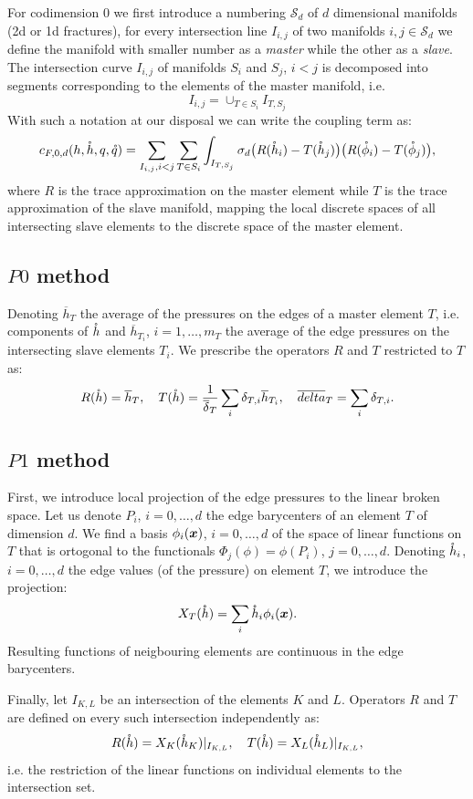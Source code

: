 For codimension 0 we first introduce a numbering $\mathcal{S}_d$ of $d$ dimensional manifolds (2d or 1d fractures), for every intersection line $I_{i,j}$ 
of two manifolds  $i,j \in \mathcal{S}_d$ we define the manifold with smaller number as a \emph{master} while the other as a \emph{slave}. 
The intersection curve $I_{i,j}$ of manifolds $S_i$ and $S_j$, $i<j$ is decomposed into segments corresponding to the elements of the master manifold, i.e.
\[
    I_{i,j} =\cup_{T\in S_i} I_{T, S_j}
\]    
With such a notation at our disposal we can write the coupling term as:
\begin{equation*}
  c_{F,0,d}(h, \mathring h, q, \mathring q) =  \sum_{I_{i,j}, i<j} \sum_{T\in S_i} \int_{I_{T, S_j}} \sigma_d
                \big(R({\mathring{h}_i}) - T({\mathring{h}_{j}}) \big)
                 \big(R({\mathring{\phi}_i}) - T({\mathring{\phi}_{j}}) \big),
\end{equation*}
where $R$ is the trace approximation on the master element while $T$ is the trace approximation of the slave manifold, mapping
the local discrete spaces of all intersecting slave elements to the discrete space of the master element.



\subsection{$P0$ method}
Denoting $\overline{h}_T$ the average of the pressures on the edges of a master element $T$, i.e. components of $\mathring h$ and 
$\overline{h}_{T_i}$, $i=1,\dots,m_T$ the average of the edge pressures on the intersecting slave elements $T_i$. We prescribe the operators $R$ and $T$ restricted 
to $T$ as:
\[
    R(\mathring{h}) = \overline{h}_T,\quad   
    T(\mathring{h}) = \frac{1}{\overline{\delta}_T} \sum_{i} \delta_{T,i} \overline{h}_{T_i}, \quad
    \overline{delta}_T = \sum_{i} \delta_{T,i}. 
\]


\subsection{$P1$ method}
First, we introduce local projection of the edge pressures to the linear broken space. Let us denote $P_i$, $i=0,\dots,d$ the edge barycenters of an element $T$ 
of dimension $d$. We find a basis $\phi_i(\mathbf{\boldsymbol{x}})$, $i=0,\dots,d$ of the space of linear functions on $T$ that is ortogonal to the functionals $\Phi_j(\phi)= \phi(P_i)$, 
$j=0,\dots, d$. Denoting $\mathring h_i$, $i=0,\dots, d$ the edge values (of the pressure) on element $T$, we introduce the projection:
\[
  X_T(\mathring h) = \sum_i \mathring h_i \phi_i(\mathbf{\boldsymbol{x}}).
\]
Resulting functions of neigbouring elements are continuous in the edge barycenters.

Finally, let $I_{K,L}$ be an intersection of the elements $K$ and $L$. Operators $R$ and $T$ are defined on every such intersection independently
as:
\[
   R(\mathring{h}) = X_K(\mathring h_K)|_{I_{K,L}},\quad   
   T(\mathring{h}) = X_L(\mathring h_L)|_{I_{K,L}}, 
\]
i.e. the restriction of the linear functions on individual elements to the intersection set.

